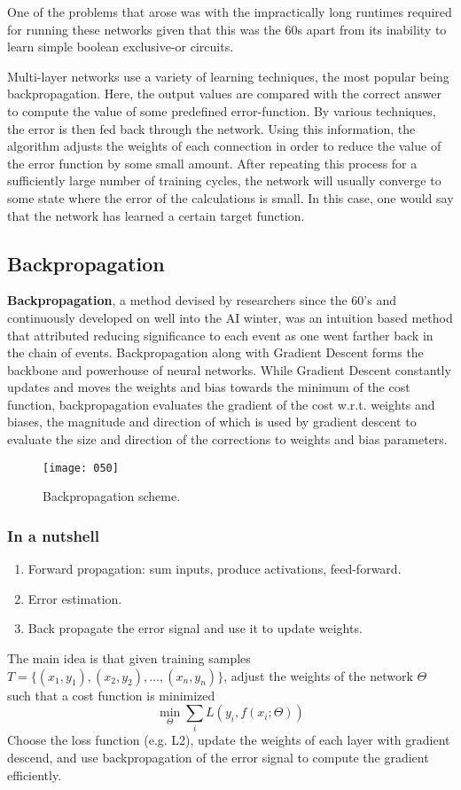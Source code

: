 One of the problems that arose was with the impractically long runtimes required for running these networks given that this was the 60s apart from its inability to learn simple boolean exclusive-or circuits.

Multi-layer networks use a variety of learning techniques, the most popular being backpropagation. Here, the output values are compared with the correct answer to compute the value of some predefined error-function. By various techniques, the error is then fed back through the network. Using this information, the algorithm adjusts the weights of each connection in order to reduce the value of the error function by some small amount. After repeating this process for a sufficiently large number of training cycles, the network will usually converge to some state where the error of the calculations is small. In this case, one would say that the network has learned a certain target function.

\subsection{Backpropagation}
\textbf{Backpropagation}, a method devised by researchers since the 60's and continuously developed on well into the AI winter, was an intuition based method that attributed reducing significance to each event as one went farther back in the chain of events. Backpropagation along with Gradient Descent forms the backbone and powerhouse of neural networks. While Gradient Descent constantly updates and moves the weights and bias towards the minimum of the cost function, backpropagation evaluates the gradient of the cost w.r.t. weights and biases, the magnitude and direction of which is used by gradient descent to evaluate the size and direction of the corrections to weights and bias parameters.

\begin{figure}[h!]
    \centering
    \texttt{[image: 050]}
    \caption{Backpropagation scheme.}
\end{figure}

\subsubsection{In a nutshell}
\begin{enumerate}
    \item Forward propagation: sum inputs, produce activations, feed-forward.
    \item Error estimation.
    \item Back propagate the error signal and use it to update weights.
\end{enumerate}
The main idea is that given training samples \(T = \{(x_1, y_1), (x_2, y_2), ..., (x_n, y_n)\}\), adjust the weights of the network \(\Theta\) such that a cost function is minimized
\begin{equation}
    \min_{\Theta} \sum_i L(y_i, f(x_i; \Theta))
\end{equation}
Choose the loss function (e.g. L2), update the weights of each layer with gradient descend, and use backpropagation of the error signal to compute the gradient efficiently.

